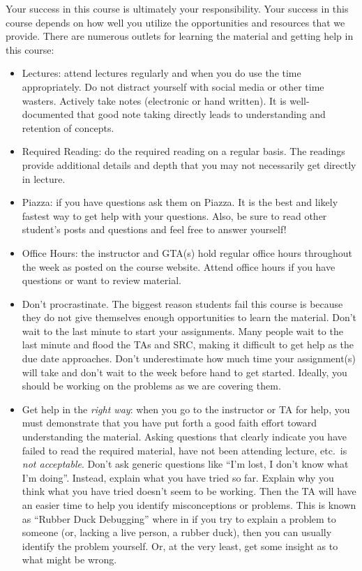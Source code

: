 \documentclass[12pt]{scrartcl}
\begin{document}
Your success in this course is ultimately your responsibility.  Your
success in this course depends on how well you utilize the opportunities
and resources that we provide.  There are numerous outlets for learning
the material and getting help in this course:
\begin{itemize}
  \item Lectures: attend lectures regularly and when you do use the 
  time appropriately.  Do not distract yourself with social media or other
  time wasters.  Actively take notes (electronic or hand written).  It is
  well-documented that good note taking directly leads to understanding and
  retention of concepts.
  \item Required Reading: do the required reading on a regular basis.  The
  readings provide additional details and depth that you may not necessarily
  get directly in lecture.  
  \item Piazza: if you have questions ask them on Piazza.  It is the best and
  likely fastest way to get help with your questions.  Also, be sure to read
  other student's posts and questions and feel free to answer yourself!
  \item Office Hours: the instructor and GTA(s) hold regular office 
  hours throughout the week as posted on the
  course website.  Attend office hours if you have questions or want to 
  review material.  
  \item Don't procrastinate.  The biggest reason students fail this course
  is because they do not give themselves enough opportunities to learn the
  material.  Don't wait to the last minute to start your assignments.  Many
  people wait to the last minute and flood the TAs and SRC, making it difficult
  to get help as the due date approaches.  Don't underestimate how much time 
  your assignment(s) will take and don't wait to the week before hand to get 
  started.  Ideally, you should be working on the problems as we are covering 
  them.
  \item Get help in the \emph{right way}: when you go to the instructor or
  TA for help, you must demonstrate that you have put forth a good faith 
  effort toward understanding the material.  Asking questions that clearly 
  indicate you have failed to read the required material, have not been
  attending lecture, etc.\ is \emph{not acceptable}.  Don't ask generic
  questions like ``I'm lost, I don't know what I'm doing''.  Instead, 
  explain what you have tried so far.  Explain why you think what you 
  have tried doesn't seem to be working.  Then the TA will have an 
  easier time to help you identify misconceptions or problems.  This 
  is known as ``Rubber Duck Debugging'' where in if you try to explain 
  a problem to someone (or, lacking a live person, a rubber duck), 
  then you can usually identify the problem yourself.  Or, at the very 
  least, get some insight as to what might be wrong.
\end{itemize}
\end{document}
